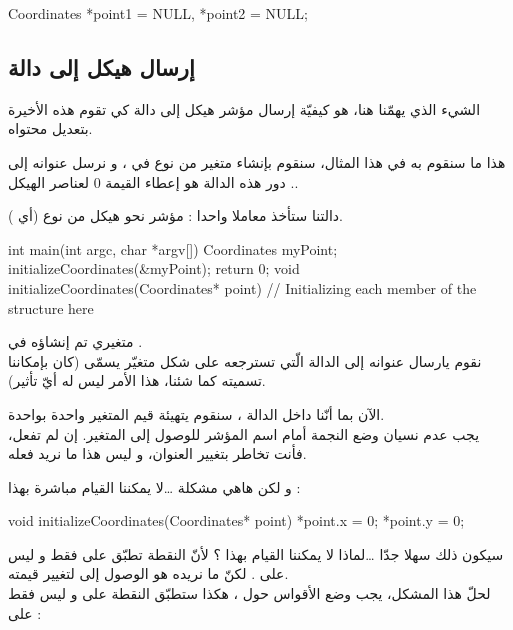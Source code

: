 \begin{Csource}
Coordinates *point1 = NULL, *point2 = NULL;
\end{Csource}

\subsection{إرسال هيكل إلى دالة}

الشيء الذي يهمّنا هنا، هو كيفيّة إرسال مؤشر هيكل إلى دالة كي تقوم هذه الأخيرة بتعديل محتواه.

هذا ما سنقوم به في هذا المثال، سنقوم بإنشاء متغير من نوع
في
،
و نرسل عنوانه إلى
.
دور هذه الدالة هو إعطاء القيمة 0 لعناصر الهيكل.

دالتنا
ستأخذ معاملا واحدا : مؤشر نحو هيكل من نوع
(أي
).

\begin{Csource}
int main(int argc, char *argv[])
{
	Coordinates myPoint;
	initializeCoordinates(&myPoint);
	 return 0;
}
void initializeCoordinates(Coordinates* point)
{
	// Initializing each member of the structure here
}
\end{Csource}

متغيري
تم إنشاؤه في
.\\
نقوم يارسال عنوانه إلى الدالة
الّتي تسترجعه على شكل متغيّر يسمّى
(كان بإمكاننا تسميته كما شئنا، هذا الأمر ليس له أيّ تأثير).

الآن بما أنّنا داخل الدالة
،
سنقوم يتهيئة قيم المتغير
واحدة بواحدة.\\
يجب عدم نسيان وضع النجمة أمام اسم المؤشر للوصول إلى المتغير. إن لم تفعل، فأنت تخاطر بتغيير العنوان، و ليس هذا ما نريد فعله.

و لكن هاهي مشكلة \dots لا يمكننا القيام مباشرة بهذا :

\begin{Csource}
void initializeCoordinates(Coordinates* point)
{
	*point.x = 0;
	*point.y = 0;
}
\end{Csource}

سيكون ذلك سهلا جدّا \dots لماذا لا يمكننا القيام بهذا ؟
لأنّ النقطة تطبّق على
فقط و ليس على
.
لكنّ ما نريده هو الوصول إلى
لتغيير قيمته.\\
لحلّ هذا المشكل، يجب وضع الأقواس حول
،
هكذا ستطبّق النقطة على
و ليس فقط على
 :

